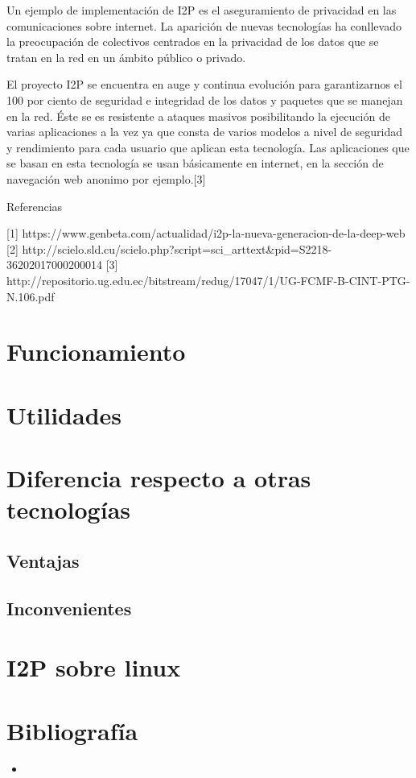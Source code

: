 \documentclass{article}
\begin{document}
Un ejemplo de implementación de I2P es el aseguramiento de privacidad en las comunicaciones sobre internet.
La aparición de nuevas tecnologías ha conllevado la preocupación de colectivos centrados en la privacidad de los datos que se tratan en la red en un ámbito público o privado.

El proyecto I2P se encuentra en auge y continua evolución para garantizarnos el 100 por ciento de seguridad e integridad de los datos y paquetes que se manejan en la red. Éste se  es resistente a ataques masivos posibilitando la ejecución de varias aplicaciones a 
la vez ya que consta de varios modelos a nivel de seguridad y rendimiento para cada usuario que aplican esta tecnología. Las aplicaciones que se basan en esta tecnología se usan básicamente en internet, en la sección de navegación web anonimo por ejemplo.[3]


Referencias

[1] https://www.genbeta.com/actualidad/i2p-la-nueva-generacion-de-la-deep-web
[2] http://scielo.sld.cu/scielo.php?script=sci_arttext&pid=S2218-36202017000200014
[3] http://repositorio.ug.edu.ec/bitstream/redug/17047/1/UG-FCMF-B-CINT-PTG-N.106.pdf


\section{Funcionamiento}
\section{Utilidades}
\section{Diferencia respecto a otras tecnologías}
\subsection{Ventajas}
\subsection{Inconvenientes}
\section{I2P sobre linux}
\section{Bibliografía}
\begin{itemize}
    \item %
\end{itemize}
\end{document}

